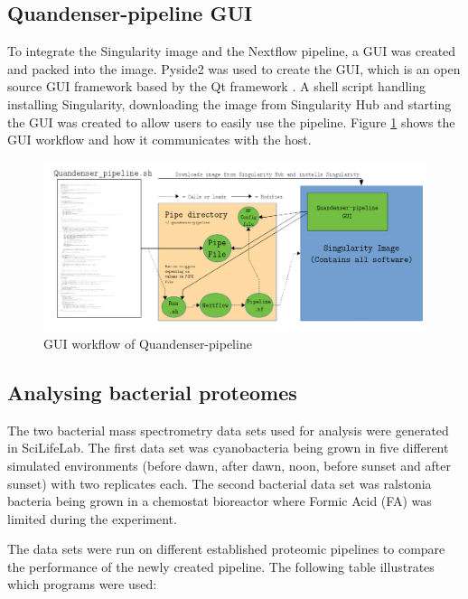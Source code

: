 \subsection{Quandenser-pipeline GUI}
To integrate the Singularity image and the Nextflow pipeline, a GUI was created and packed into the image. Pyside2 was used to create the GUI, which is an open source GUI framework based by the Qt framework \cite{pyside2}. A shell script handling installing Singularity, downloading the image from Singularity Hub and starting the GUI was created to allow users to easily use the pipeline. Figure \ref{fig:GUI_workflow} shows the GUI workflow and how it communicates with the host.

\begin{figure}[!htbp]
  \includegraphics[width=\linewidth]{pictures/GUI_workflow.png}
  \caption{GUI workflow of Quandenser-pipeline}
  \label{fig:GUI_workflow}
\end{figure}

\subsection{Analysing bacterial proteomes}

The two bacterial mass spectrometry data sets used for analysis were generated in SciLifeLab. The first data set was cyanobacteria being grown in five different simulated environments (before dawn, after dawn, noon, before sunset and after sunset) with two replicates each. The second bacterial data set was ralstonia bacteria being grown in a chemostat bioreactor where Formic Acid (FA) was limited during the experiment.

The data sets were run on different established proteomic pipelines to compare the performance of the newly created pipeline. The following table illustrates which programs were used:

